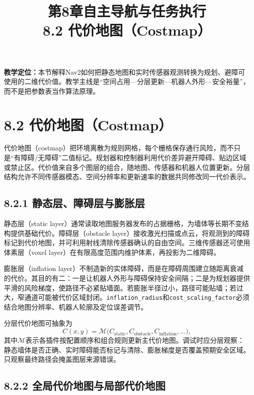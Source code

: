 \documentclass[UTF8,zihao=-4]{ctexart}
\title{第8章自主导航与任务执行\\\large 8.2 代价地图（Costmap）}
\author{}\date{}
\begin{document}
\maketitle

\noindent\textbf{教学定位：}本节解释Nav2如何把静态地图和实时传感器观测转换为规划、避障可使用的二维代价值。教学主线是“空间占用---分层更新---机器人外形---安全裕量”，而不是把参数表当作算法原理。

\section*{8.2 代价地图（Costmap）}

代价地图（costmap）把环境离散为规则网格，每个栅格保存通行风险，而不只是“有障碍/无障碍”二值标记。规划器和控制器利用代价差异避开障碍、贴边区域或禁止区。代价值来自多个图层的组合，随地图、传感器和机器人位置更新。分层结构允许不同传感器模态、空间分辨率和更新速率的数据共同修改同一代价表示\cite{navigation2source,macenski2023survey,macenski2020nav2}。

\subsection*{8.2.1 静态层、障碍层与膨胀层}

静态层（static layer）通常读取地图服务器发布的占据栅格，为墙体等长期不变结构提供基础代价。障碍层（obstacle layer）接收激光扫描或点云，将观测到的障碍标记到代价地图，并可利用射线清除传感器确认的自由空间。三维传感器还可使用体素层（voxel layer）在有限高度范围内维护体素，再投影为二维障碍。

膨胀层（inflation layer）不制造新的实体障碍，而是在障碍周围建立随距离衰减的代价。其目的有二：一是让机器人外形与障碍保持安全间隔；二是为规划器提供平滑的风险梯度，使路径不必紧贴墙面。若膨胀半径过小，路径可能贴墙；若过大，窄通道可能被代价区域封闭。\texttt{inflation\_radius}和\texttt{cost\_scaling\_factor}必须结合地图分辨率、机器人轮廓及定位误差调节。

分层代价地图可抽象为
\begin{equation}
  C(x,y)=\mathcal{M}\bigl(C_{\mathrm{static}},C_{\mathrm{obstacle}},C_{\mathrm{inflation}},\ldots\bigr),
  \label{eq:layered-costmap}
\end{equation}
其中$\mathcal{M}$表示各插件按配置顺序和组合规则更新主代价地图。调试时应分层观察：静态墙体是否正确、实时障碍能否标记与清除、膨胀梯度是否覆盖预期安全区域。只观察最终路径会掩盖图层来源错误。

\subsection*{8.2.2 全局代价地图与局部代价地图}
\end{document}
